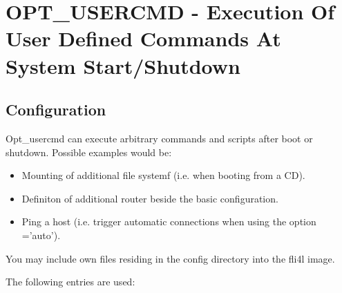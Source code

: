 {
\section {OPT\_USERCMD - Execution Of User Defined Commands At System Start/Shutdown}
}

\subsection{Configuration}

Opt\_usercmd can execute arbitrary commands and scripts after boot or shutdown.
Possible examples would be:
\begin{itemize}
    \item Mounting of additional file systemf (i.e. when booting from a CD).
    \item Definiton of additional router beside the basic configuration.
    \item Ping a host (i.e. trigger automatic connections when using the option ='auto').
\end{itemize}

You may include own files residing in the config directory into the fli4l image.

The following entries are used:

